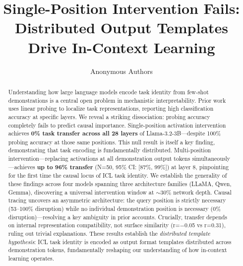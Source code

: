 \documentclass[runningheads]{llncs}
\begin{document}
\title{Single-Position Intervention Fails: \\
Distributed Output Templates Drive In-Context Learning}


\author{Anonymous Authors}



\maketitle

\begin{abstract}
Understanding how large language models encode task identity from few-shot demonstrations is a central open problem in mechanistic interpretability. Prior work uses linear probing to localize task representations, reporting high classification accuracy at specific layers. We reveal a striking dissociation: probing accuracy completely fails to predict causal importance. Single-position activation intervention achieves \textbf{0\% task transfer across all 28 layers} of Llama-3.2-3B---despite 100\% probing accuracy at those same positions. This null result is itself a key finding, demonstrating that task encoding is fundamentally distributed. Multi-position intervention---replacing activations at all demonstration output tokens simultaneously---achieves \textbf{up to 96\% transfer} (N=50, 95\% CI: [87\%, 99\%]) at layer 8, pinpointing for the first time the causal locus of ICL task identity. We establish the generality of these findings across four models spanning three architecture families (LLaMA, Qwen, Gemma), discovering a universal intervention window at $\sim$30\% network depth. Causal tracing uncovers an asymmetric architecture: the query position is strictly necessary (53--100\% disruption) while no individual demonstration position is necessary (0\% disruption)---resolving a key ambiguity in prior accounts. Crucially, transfer depends on internal representation compatibility, not surface similarity (r=$-$0.05 vs r=0.31), ruling out trivial explanations. These results establish the \emph{distributed template hypothesis}: ICL task identity is encoded as output format templates distributed across demonstration tokens, fundamentally reshaping our understanding of how in-context learning operates.

\end{abstract}
\end{document}
